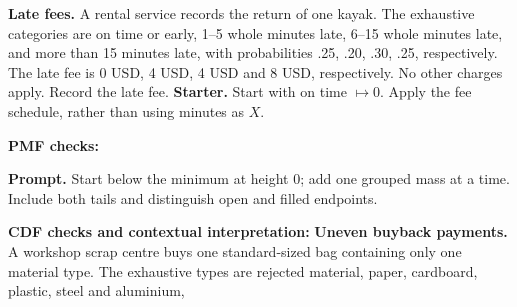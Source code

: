 \textbf{Late fees.} A rental service records the return of one kayak. The exhaustive categories are on time or
early, 1--5 whole minutes late, 6--15 whole minutes late, and more than 15 minutes late, with probabilities
.25, .20, .30, .25, respectively. The late fee is 0 USD, 4 USD, 4 USD and 8 USD, respectively. No other
charges apply. Record the late fee.
\textbf{Starter.} Start with on time $\mapsto0$. Apply the fee schedule, rather than using minutes as $X$.
\par%
\noindent%
\begin{minipage}[t]{.37\linewidth}%
\vspace{0pt}\centering
{}%
\end{minipage}%
\hfill%
\begin{minipage}[t]{.60\linewidth}%
\vspace{0pt}\centering
{}
\end{minipage}%
\par
\textbf{PMF checks:} \hrulefill%
\par
{}
\textbf{Prompt.} Start below the minimum at height 0; add one grouped mass at a time. Include both tails and
distinguish open and filled endpoints.
\par%
\noindent%
\begin{minipage}[t]{.37\linewidth}%
\vspace{0pt}\centering
{}%
\end{minipage}%
\hfill%
\begin{minipage}[t]{.60\linewidth}%
\vspace{0pt}\centering
{}
\end{minipage}%
\par
\textbf{CDF checks and contextual interpretation:}
\vfill
\clearpage
{}
\textbf{Uneven buyback payments.} A workshop scrap centre buys one standard-sized bag containing only one
material type. The exhaustive types are rejected material, paper, cardboard, plastic, steel and aluminium,
